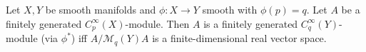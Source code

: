 Let $X, Y$ be smooth manifolds and $\phi: X \to Y$ smooth with $\phi(p) = q$. Let $A$ be a finitely generated $C_p^\infty(X)$-module. Then $A$ is a finitely generated $C_q^\infty(Y)$-module (via $\phi^*$) iff $A / \mathcal{M}_q(Y)A$ is a finite-dimensional real vector space.
